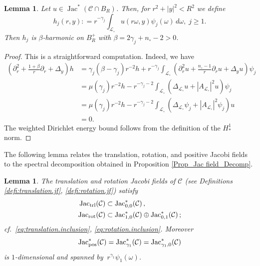 \documentclass[11pt, letterpaper, reqno]{amsart}
\numberwithin{equation}{section}
\newtheorem{Lem}[Def]{Lemma}
\theoremstyle{remark}
\newcommand{\cC}{\mathcal{C}}
\newcommand{\cL}{\mathcal{L}}
\newcommand{\Jac}{\operatorname{Jac}}
\begin{document}
    \begin{Lem}\label{Lem_spect proj Jac are beta harmonic}
    Let $u \in \Jac^*(\cC \cap B_R)$. Then, for $r^2+|y|^2 < R^2$ we define
    \[
    h_j(r,y) : = r^{-\gamma_j} \int_{\cL_\circ} u(r\omega,y) \psi_j(\omega) \, d\omega, \; j \geq 1.
    \]
    Then $h_j$ is $\beta$-harmonic on $B^+_R$ with $\beta = 2\gamma_j + n_\circ-2>0$. 
    \end{Lem}
    \begin{proof}
This is a straightforward computation. Indeed, we have    \begin{align*}
     \left(\partial_r^2 + \tfrac{1+\beta}{r}\partial_r + \Delta_y\right)h   & = \gamma_j(\beta-\gamma_j) r^{-2} h + r^{-\gamma_j} \int_{\cL_\circ}  \left( \partial^2_r u + \tfrac{n_\circ-1}{r} \partial_r u + \Delta_y u\right)  \psi_j \\
    & = \mu(\gamma_j) r^{-2} h - r^{-\gamma_j-2} \int_{\cL_\circ}  \left( \Delta_{\cL_\circ} u +  |A_{\cL_\circ}|^2 u \right)  \psi_j \\
        & = \mu(\gamma_j) r^{-2} h - r^{-\gamma_j-2} \int_{\cL_\circ}  \left( \Delta_{\cL_\circ} \psi_j +  |A_{\cL_\circ}|^2 \psi_j \right) u \\
        & = 0. 
    \end{align*}
    The weighted Dirichlet energy bound follows from the definition of the $H^1_*$ norm. 
\end{proof}
The following lemma relates the translation, rotation, and positive Jacobi fields to the spectral decomposition obtained in Proposition \ref{Prop_Jac field_Decomp}. 

    \begin{Lem}\label{Lem_Jac field_Jac_(trl, rot, pos)}
    The translation and rotation Jacobi fields of $\cC$ (see Definitions \ref{defi:translation.jf}, \ref{defi:rotation.jf}) satisfy
         \begin{align*}
       \Jac_\textnormal{trl}(\cC)& \subset \Jac^*_{0, 0}(\cC)\,, \\
       \Jac_\textnormal{rot}(\cC) & \subset \Jac^*_{1, 0}(\cC)\oplus \Jac^*_{0, 1}(\cC) \,;
     \end{align*}
     cf.\  \eqref{eq:translation.inclusion}, \eqref{eq:rotation.inclusion}. Moreover
     \[
      \Jac_\textnormal{pos}^*(\cC) = \Jac^*_{\gamma_1}(\cC) = \Jac^*_{\gamma_1, 0}(\cC)   \]
      is $1$-dimensional and spanned by $\ r^{\gamma_1}\psi_1(\omega)$. 
    \end{Lem}
\end{document}
